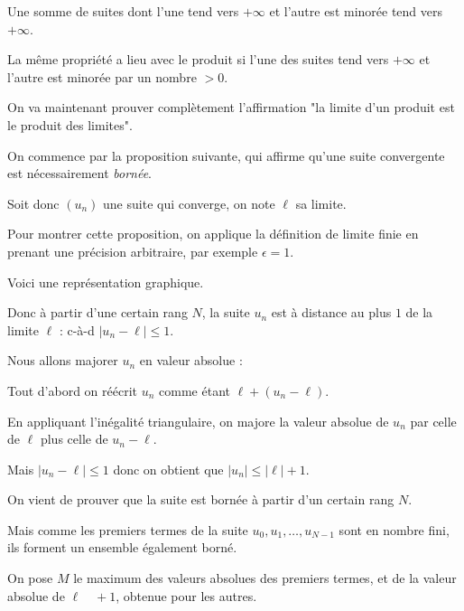 \change 

Une somme de suites dont l'une tend vers $+\infty$ et l'autre 
est minorée tend vers $+\infty$.

\change

La même propriété a lieu avec le produit si l'une des suites 
tend vers $+\infty$ et l'autre est minorée par un nombre $>0$.

 \diapo

 On va maintenant prouver complètement l'affirmation 
 "la limite d'un produit est le produit des limites".

 On commence par la proposition suivante, qui affirme qu'une suite convergente est nécessairement \emph{bornée}.

 \change

 Soit donc $(u_n)$ une suite qui converge, on note $\ell$ sa limite.
 
 \change
 
 Pour montrer cette proposition, on applique la définition de limite finie 
 en prenant une précision arbitraire, par exemple $\epsilon=1$. 

 Voici une représentation graphique.
 
 
 \change 

 Donc à partir d'une certain rang $N$, la suite $u_n$ est à distance au plus $1$ de la limite $\ell$ :
 c-à-d $|u_n-\ell| \le 1$.

 \change

 Nous allons majorer $u_n$ en valeur absolue :
 
 \change
 
 Tout d'abord on réécrit $u_n$ comme étant $\ell + (u_n-\ell)$.
 
 \change
 
 
 En appliquant l'inégalité triangulaire, on majore la valeur absolue de $u_n$ par celle de $\ell$ plus 
 celle de $u_n-\ell$.

 \change
 
 Mais $|u_n-\ell| \le 1$ donc on obtient que $|u_n| \le |\ell|+1$.
 
 On vient de prouver que la suite est bornée à partir d'un certain rang $N$.

\change

Mais comme les premiers termes de la suite 
$u_0, u_1,\ldots,u_{N-1}$ sont en nombre fini, 
ils forment un ensemble également borné.

On pose $M$ le maximum des valeurs absolues des premiers termes, 
et de la valeur absolue de $\ell \quad +1$, obtenue pour les autres.

